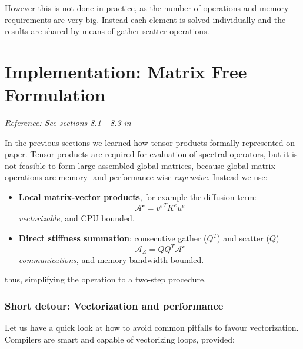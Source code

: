 \documentclass[
  a4paper,
  10pt]{article}
\providecommand{\tightlist}{%
  \setlength{\itemsep}{0pt}\setlength{\parskip}{0pt}}
\begin{document}
However this is not done in practice, as the number of operations and
memory requirements are very big. Instead each element is solved
individually and the results are shared by means of gather-scatter
operations.

\hypertarget{implementation-matrix-free-formulation}{%
\section{Implementation: Matrix Free
Formulation}\label{implementation-matrix-free-formulation}}

\emph{Reference: See sections 8.1 - 8.3 in \citet{Deville} }

In the previous sections we learned how tensor products formally
represented on paper. Tensor products are required for evaluation of
spectral operators, but it is not feasible to form large assembled
global matrices, because global matrix operations are memory- and
performance-wise \emph{expensive}. Instead we use:

\begin{itemize}
\tightlist
\item
  \textbf{Local matrix-vector products}, for example the diffusion term:
  \[\mathcal{A^e}=\underline{v^e}^{T}K^e\underline{u^e}\]
  \emph{vectorizable}, and CPU bounded.
\item
  \textbf{Direct stiffness summation}: consecutive gather (\(Q^T\)) and
  scatter (\(Q\)) \[\mathcal{A_L} = Q Q^T \mathcal{A^e}\]
  \emph{communications}, and memory bandwidth bounded.
\end{itemize}

thus, simplifying the operation to a two-step procedure.

\hypertarget{short-detour-vectorization-and-performance}{%
\subsubsection{Short detour: Vectorization and
performance}\label{short-detour-vectorization-and-performance}}

Let us have a quick look at how to avoid common pitfalls to favour
vectorization. Compilers are smart and capable of vectorizing loops,
provided:
\end{document}
